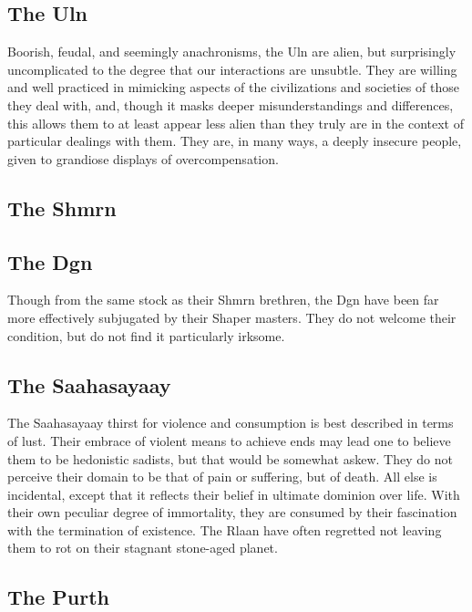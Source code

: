 \subsection{The Uln}

Boorish, feudal, and seemingly anachronisms, the Uln are alien, but
surprisingly uncomplicated to the degree that our interactions are
unsubtle. They are willing and well practiced in mimicking aspects of
the civilizations and societies of those they deal with, and, though
it masks deeper misunderstandings and differences, this allows them to
at least appear less alien than they truly are in the context of
particular dealings with them. They are, in many ways, a deeply
insecure people, given to grandiose displays of overcompensation.

\subsection{The Shmrn}

\subsection{The Dgn}

Though from the same stock as their Shmrn brethren, the Dgn have been
far more effectively subjugated by their Shaper masters. They do not
welcome their condition, but do not find it particularly irksome.

\subsection{The Saahasayaay}

The Saahasayaay thirst for violence and consumption is best described
in terms of lust. Their embrace of violent means to achieve ends may
lead one to believe them to be hedonistic sadists, but that would be
somewhat askew. They do not perceive their domain to be that of pain
or suffering, but of death. All else is incidental, except that it
reflects their belief in ultimate dominion over life. With their own
peculiar degree of immortality, they are consumed by their fascination
with the termination of existence. The Rlaan have often regretted not
leaving them to rot on their stagnant stone-aged planet.

\subsection{The Purth}

